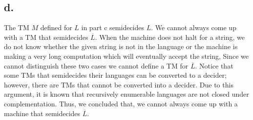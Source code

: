 \documentclass[12pt]{article}
\begin{document}
\subsection*{d.}
The TM $M$ defined for $L$ in part c semidecides $L$. We cannot always come up with a TM that semidecides $\overline{L}$.  When the machine does not halt for a string, we do not know whether the given string is not in the language or the machine is making a very long computation which will eventually accept the string, Since we cannot distinguish these two cases we cannot define a TM for $\overline{L}$. Notice that some TMs that semidecides their languages can be converted to a decider; however, there are TMs that cannot be converted into a decider. Due to this argument, it is known that recursively enumerable languages are not closed under complementation. Thus, we concluded that, we cannot always come up with a machine that semidecides $\overline{L}$.



\end{document}
